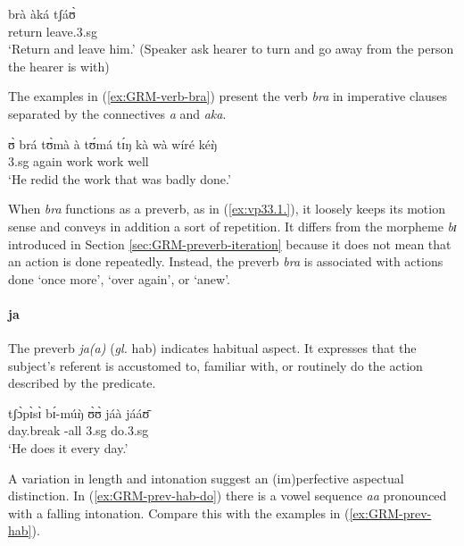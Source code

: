 \begin{exe}
\begin{exe}
\begin{exe}
{\begin{exe}
\begin{exe}
\begin{exe}
\begin{exe}
\begin{exe}
\begin{exe}
\begin{exe}
\begin{xlist}
\begin{exe}
\begin{exe}
\begin{exe}
\begin{exe}
\begin{exe}
\begin{exe}
\begin{exe}
\begin{exe}
\begin{exe}
\begin{exe}
\begin{exe}
\begin{exe}
\begin{exe}
\begin{exe}
\begin{exe}
\ex
\gll brà àká tʃáʊ̀\\
return {\conn} leave.{\sc 3.sg}\\
\glt `Return and leave him.' (Speaker ask hearer to turn and go away from the 
person the hearer is with)

\z 
 \z

The examples 
in (\ref{ex:GRM-verb-bra}) present the verb {\it bra} in imperative clauses
separated by the connectives {\it a} and {\it aka}. 

\ea\label{ex:vp33.1.}
\gll ʊ̀ brá tʊ̀mà à tʊ́má tɪ́ŋ kà wà wíré kéŋ̀ \\
 {\sc 3.sg}  {again}  {work} {\art} {work}   {\art} {\egr} {\neg} well {\dxm}\\
\glt  `He redid the work that was badly done.'
\z


When {\it bra} functions as 
a preverb, as in (\ref{ex:vp33.1.}),  it loosely keeps its motion sense and
conveys in addition a sort of repetition. It differs from the morpheme {\it bɪ}
introduced in
 Section \ref{sec:GRM-preverb-iteration} because it does not mean that an
action is
done
repeatedly.  Instead, the preverb {\it bra} is associated with actions done 
`once
more', `over again',  or `anew'.




\paragraph{ja}
\label{sec:GRM-preverb-hab}

The preverb {\it ja(a)} ({\it gl.} {\sc hab})  indicates habitual aspect. It 
expresses that the subject's referent is accustomed to, familiar with, or 
routinely do the action described by the predicate.


\ea\label{ex:GRM-prev-hab-do}
\gll tʃɔ̀pɪ̀sɪ̀ bɪ́-múŋ̀ ʊ̀ʊ̀ jáà jááʊ̄ \\
 day.break {\itr}-all {\sc 3.sg} {\hab} do.{\sc 3.sg}\\
\glt `He does it every day.'
\z 

 A variation in  length and intonation suggest  an (im)perfective aspectual 
distinction. In   (\ref{ex:GRM-prev-hab-do})  there is a  vowel sequence {\it 
aa} pronounced with a falling intonation. Compare this with the examples in 
(\ref{ex:GRM-prev-hab}). 




\end{exe}
\end{exe}
\end{exe}
\end{exe}
\end{exe}
\end{exe}
\end{exe}
\end{exe}
\end{exe}
\end{exe}
\end{exe}
\end{exe}
\end{exe}
\end{exe}
\end{exe}
\end{xlist}
\end{exe}
\end{exe}
\end{exe}
\end{exe}
\end{exe}
\end{exe}
\end{exe}}
\end{exe}
\end{exe}
\end{exe}
